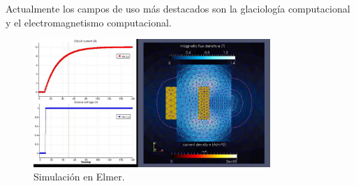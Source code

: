 \documentclass[
    11pt,
    spanish,
    a4paper
]{article}
\begin{document}
Actualmente los campos de uso más destacados son la glaciología computacional y el electromagnetismo computacional.

\begin{figure}[htbp]
	\centering
	\includegraphics[width=0.8\textwidth]{img/elmer.jpg}
	\caption{Simulación en Elmer.}
	\label{fig:elmer}
\end{figure}

\newpage
\end{document}
